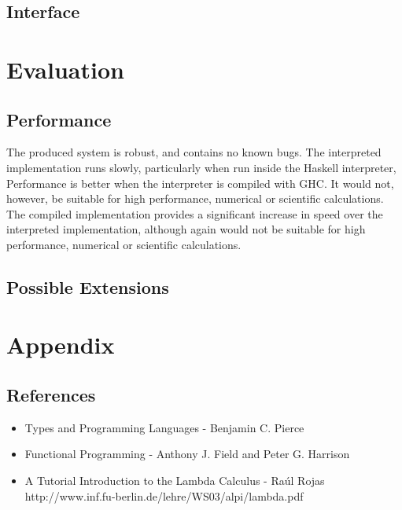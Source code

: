 \documentclass{article}
\begin{document}
\subsection{Interface}

\pagebreak
\section{Evaluation}
\subsection{Performance}
The produced system is robust, and contains no known bugs. The interpreted implementation runs slowly, particularly when run inside the Haskell interpreter, Performance is better when the interpreter is compiled with GHC. It would not, however, be suitable for high performance, numerical or scientific calculations. The compiled implementation provides a significant increase in speed over the interpreted implementation, although again would not be suitable for high performance, numerical or scientific calculations.
\subsection{Possible Extensions}

\pagebreak
\section{Appendix}
\subsection{References}
\begin{itemize}
    \item Types and Programming Languages - Benjamin C. Pierce
    \item Functional Programming - Anthony J. Field and Peter G. Harrison
    \item A Tutorial Introduction to the Lambda Calculus - Ra\'{u}l Rojas \\
        http://www.inf.fu-berlin.de/lehre/WS03/alpi/lambda.pdf
\end{itemize}
\end{document}
